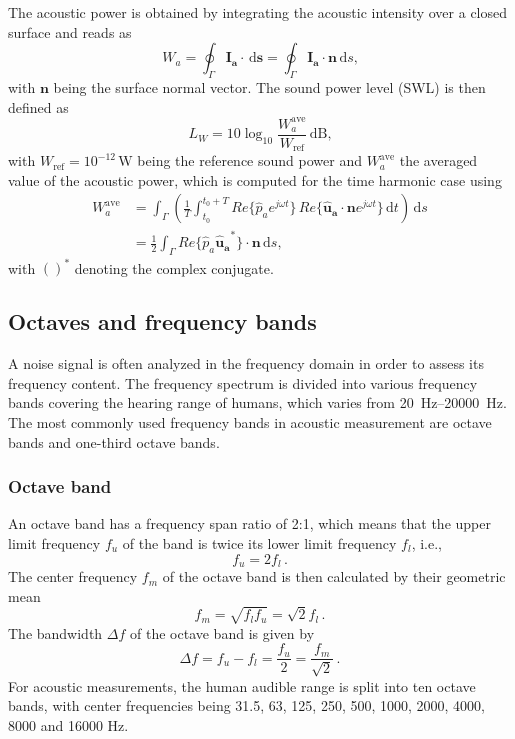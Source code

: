 The acoustic power is obtained by integrating the acoustic intensity over a closed surface and reads as
\begin{equation}
	W_a = \oint_{\Gamma} \boldsymbol{I_a}\cdot\,\text{d}\boldsymbol{s} = \oint_{\Gamma} \boldsymbol{I_a}\cdot\boldsymbol{n}\,\text{d}s \text{,}
\end{equation}
with $\boldsymbol{n}$ being the surface normal vector. The sound power level (SWL) is then defined as
\begin{equation}
	L_W = 10\log_{10}\frac{W_a^{\text{ave}}}{W_\text{ref}}\,\text{dB}\text{,}
\end{equation}
with $W_\text{ref} = 10^{-12}\,\text{W}$ being the reference sound power and $W_a^{\text{ave}}$ the averaged value of the acoustic power, which is computed for the time harmonic case using
\begin{align}
	W_a^{\text{ave}} &= \int_{\Gamma}\left(\frac{1}{T} \int_{t_0}^{t_0 + T} Re\lbrace\hat{p}_a e^{j\omega t}\rbrace\,Re\lbrace\boldsymbol{\hat{u}_a} \cdot \boldsymbol{n} e^{j\omega t}\rbrace \, \text{d}t  \right)\,\text{d}s \\
	&= \frac{1}{2} \int_{\Gamma} Re\lbrace\hat{p}_a \boldsymbol{\hat{u}_a}^*\rbrace \cdot \boldsymbol{n}\,\text{d}s \text{,}
\end{align}
with $()^*$ denoting the complex conjugate.

\newpage
\subsection{Octaves and frequency bands}

A noise signal is often analyzed in the frequency domain in order to assess its frequency content. The frequency spectrum is divided into various frequency bands covering the hearing range of humans, which varies from \SIrange{20}{20000}{\hertz}. The most commonly used frequency bands in acoustic measurement are octave bands and one-third octave bands.

\subsubsection*{Octave band}
An octave band has a frequency span ratio of 2:1, which means that the upper limit frequency $f_u$ of the band is twice its lower limit frequency $f_l$, i.e.,
\begin{equation}
	f_u = 2f_l\,.
\end{equation}
The center frequency $f_m$ of the octave band is then calculated by their geometric mean
\begin{equation}
	f_m = \sqrt{f_l f_u} = \sqrt{2}f_l\,.
\end{equation}
The bandwidth $\Delta f$ of the octave band is given by
\begin{equation}
	\Delta f = f_u - f_l = \frac{f_u}{2} = \frac{f_m}{\sqrt{2}}\,.
\end{equation}
For acoustic measurements, the human audible range is split into ten octave bands, with center frequencies being 31.5, 63, 125, 250, 500, 1000, 2000, 4000, 8000 and 16000 Hz.

